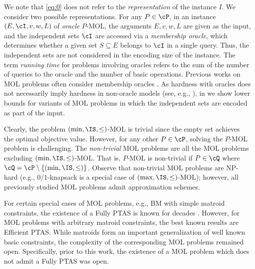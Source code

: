 We note that \eqref{eq:0} does not refer to the {\em representation} of the instance $I$. We consider two possible representations.
For any $P \in \cP$, in an instance $(E,\cI,v,w,L)$ of {\em oracle} $P$-MOL, the arguments
$E,v,w,L$ are given as the input, and the independent sets $\cI$ are accessed via a {\em membership oracle}, which determines whether a given set $S \subseteq E$ belongs to  $\cI$ in a single query. Thus, the independent sets are not considered in the encoding size of the instance. The term {\em running time} for problems involving oracles refers to the sum of the number of queries to the oracle and the number of basic operations. 
Previous works on MOL problems often consider membership oracles \cite{CVZ11,BBGS11,CCNR13,DKS23,DKS23b}. As hardness with oracles does not necessarily imply hardness in non-oracle models (see, e.g., \cite{canetti2004random,chang1994random}), in  we show lower bounds for variants of MOL problems in which the independent sets are encoded as part of the input.   




Clearly, the problem $(\min,\IS,\leq)$-MOL is trivial since the empty set achieves the optimal objective value. 
However, for any other $P \in \cP$, solving the $P$-MOL problem is challenging.
The {\em non-trivial} MOL problems are all the MOL problems excluding $(\min,\IS,\leq)$-MOL. That is, $P$-MOL is non-trivial if $P\in \cQ$ where  $\cQ = \cP \setminus \{(\min,\IS,\leq)\}$.
 Observe that non-trivial MOL problems are NP-hard (e.g., $0/1${\sc-knapsack} is a special case of $(\max,\IS,\leq)$-MOL);
however, %
all previously studied MOL problems admit approximation schemes.




For certain special cases of MOL problems, e.g., BM with simple matroid constraints,
the existence of a Fully PTAS is known for decades \cite{Si79,caprara2000approximation}.
However, for MOL problems with arbitrary matroid constraints, the best known results are Efficient PTAS.  While matroids form an important generalization of well known basic
constraints,
the complexity of the corresponding MOL problems remained open. Specifically, prior to this work, the existence of a MOL problem which does not admit a Fully PTAS was open.





